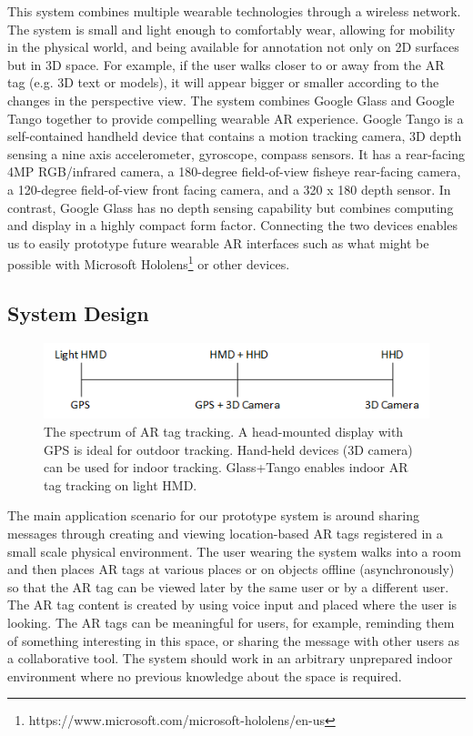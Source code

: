 This system combines multiple wearable technologies through a wireless network. The system is small and light enough to comfortably wear, allowing for mobility in the physical world, and being available for annotation not only on 2D surfaces but in 3D space. For example, if the user walks closer to or away from the AR tag (e.g. 3D text or models), it will appear bigger or smaller according to the changes in the perspective view. The system combines Google Glass and Google Tango together to provide compelling wearable AR experience. Google Tango is a self-contained handheld device that contains a motion tracking camera, 3D depth sensing a nine axis accelerometer, gyroscope, compass sensors. It has a rear-facing 4MP RGB/infrared camera, a 180-degree field-of-view fisheye rear-facing camera, a 120-degree field-of-view front facing camera, and a 320 x 180 depth sensor. In contrast, Google Glass has no depth sensing capability but combines computing and display in a highly compact form factor. Connecting the two devices enables us to easily prototype future wearable AR interfaces such as what might be possible with Microsoft Hololens\footnote{https://www.microsoft.com/microsoft-hololens/en-us} or other devices.


\subsection{System Design}

\begin{figure}[ht]
  \centering
  \includegraphics[width=.8\linewidth]{images/mgia15/tango_paper_continuum.png}
  \caption{The spectrum of AR tag tracking. A head-mounted display with GPS is ideal for outdoor tracking. Hand-held devices (3D camera) can be used for indoor tracking. Glass+Tango enables indoor AR tag tracking on light HMD.}
  \label{fig:mgia15:spectrum}
\end{figure}

The main application scenario for our prototype system is around sharing messages through creating and viewing location-based AR tags registered in a small scale physical environment. The user wearing the system walks into a room and then places AR tags at various places or on objects offline (asynchronously) so that the AR tag can be viewed later by the same user or by a different user. The AR tag content is created by using voice input and placed where the user is looking. The AR tags can be meaningful for users, for example, reminding them of something interesting in this space, or sharing the message with other users as a collaborative tool. The system should work in an arbitrary unprepared indoor environment where no previous knowledge about the space is required. 

